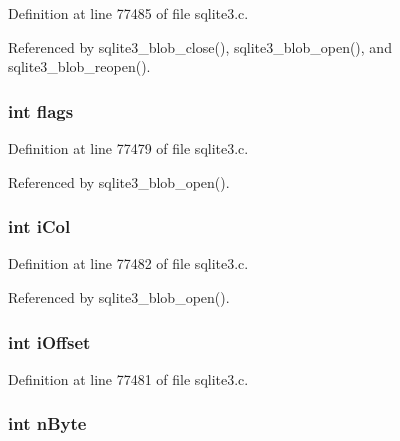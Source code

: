 Definition at line 77485 of file sqlite3.\+c.



Referenced by sqlite3\+\_\+blob\+\_\+close(), sqlite3\+\_\+blob\+\_\+open(), and sqlite3\+\_\+blob\+\_\+reopen().

\hypertarget{struct_incrblob_ac8bf36fe0577cba66bccda3a6f7e80a4}{}
\subsubsection[{flags}]{\setlength{\rightskip}{0pt plus 5cm}int flags}\label{struct_incrblob_ac8bf36fe0577cba66bccda3a6f7e80a4}


Definition at line 77479 of file sqlite3.\+c.



Referenced by sqlite3\+\_\+blob\+\_\+open().

\hypertarget{struct_incrblob_a45704caa26eec073e116c7f544047e5e}{}
\subsubsection[{i\+Col}]{\setlength{\rightskip}{0pt plus 5cm}int i\+Col}\label{struct_incrblob_a45704caa26eec073e116c7f544047e5e}


Definition at line 77482 of file sqlite3.\+c.



Referenced by sqlite3\+\_\+blob\+\_\+open().

\hypertarget{struct_incrblob_a7257a503e6fefa9f18d900e52ec8dc75}{}
\subsubsection[{i\+Offset}]{\setlength{\rightskip}{0pt plus 5cm}int i\+Offset}\label{struct_incrblob_a7257a503e6fefa9f18d900e52ec8dc75}


Definition at line 77481 of file sqlite3.\+c.

\hypertarget{struct_incrblob_ae4a4d0ce9a4469ed14e6e2277254f3b1}{}
\subsubsection[{n\+Byte}]{\setlength{\rightskip}{0pt plus 5cm}int n\+Byte}\label{struct_incrblob_ae4a4d0ce9a4469ed14e6e2277254f3b1}


